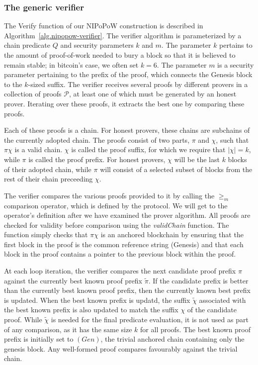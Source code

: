 \subsubsection{The generic verifier}

The \textsf{Verify} function of our NIPoPoW construction is described in
Algorithm~\ref{alg.nipopow-verifier}. The verifier algorithm is parameterized by
a chain predicate $Q$ and security parameters $k$ and $m$. The parameter $k$
pertains to the amount of proof-of-work needed to bury a block so that it is
believed to remain stable; in bitcoin's case, we often set $k = 6$. The
parameter $m$ is a security parameter pertaining to the prefix of the proof,
which connects the Genesis block to the $k$-sized suffix.  The verifier receives
several proofs by different provers in a collection of proofs $\mathcal{P}$, at
least one of which must be generated by an honest prover. Iterating over these
proofs, it extracts the best one by comparing these proofs.

Each of these proofs is a chain. For honest provers, these
chains are subchains of the currently adopted chain. The proofs consist of two
parts, $\pi$ and $\chi$, such that $\pi \chi$ is a valid chain. $\chi$ is called
the proof suffix, for which we require that $|\chi| = k$, while $\pi$ is called
the proof prefix. For honest provers, $\chi$ will be the last $k$ blocks of
their adopted chain, while $\pi$ will consist of a selected subset of blocks
from the rest of their chain preceeding $\chi$.

The verifier compares the various proofs provided to it by calling the $\geq_m$
comparison operator, which is defined by the protocol. We will get to the
operator's definition after we have examined the prover algorithm. All proofs
are checked for validity before comparison using the \textit{validChain}
function. The function simply checks that $\pi\chi$ is an anchored blockchain by
ensuring that the first block in the proof is the common reference string
(Genesis) and that each block in the proof contains a pointer to the previous
block within the proof.

At each loop iteration, the verifier compares the next candidate proof prefix
$\pi$ against the currently best known proof prefix $\tilde\pi$. If the
candidate prefix is better than the currently best known proof prefix, then the
currently known best prefix is updated.  When the best known prefix is updatd,
the suffix $\tilde\chi$ associated with the best known prefix is also updated to
match the suffix $\chi$ of the candidate proof. While $\tilde\chi$ is needed for
the final predicate evaluation, it is not used as part of any comparison, as it
has the same size $k$ for all proofs. The best known proof prefix is initially
set to $(Gen)$, the trivial anchored chain containing only the genesis block.
Any well-formed proof compares favourably against the trivial chain.

